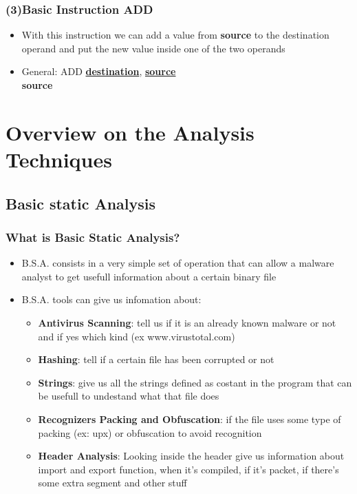 \documentclass[]{beamer}
\begin{document}
		\begin{frame}
			\frametitle{(3)Basic Instruction ADD}
			\begin{itemize}
				\item{With this instruction we can add a value from \textbf{source}  to the destination operand and put the new value inside one of the two operands}
				\item{General: ADD \underline{\textbf{destination}}, \underline{\textbf{source}}\\
					\textbf{source}}
			\end{itemize}
		\end{frame}
\section {Overview on the Analysis Techniques }
	\subsection{Basic static Analysis}
		\begin{frame}
			\frametitle{What is Basic Static Analysis?}
			
			\begin{itemize}
				\item {B.S.A. consists in a very simple set of operation that can allow a malware analyst to get usefull information about a certain binary file}
				\item {B.S.A. tools can give us infomation about:}
				\begin{itemize}
					\item{\textbf{Antivirus Scanning}: tell us if it is an already known malware or not and if yes which kind (ex www.virustotal.com) }
					\item{\textbf{Hashing}: tell if a certain file has been corrupted or not}
					\item{\textbf{Strings}: give us all the strings defined as costant in the program that can be usefull to undestand what that file does}
					\item{\textbf{Recognizers Packing and Obfuscation}: if the file uses some type of packing (ex: upx) or obfuscation to avoid recognition} 
					\item{\textbf{Header Analysis}: Looking inside the header give us information about import and export function, when it's compiled, if it's packet, if there's some extra segment and other stuff }
				\end{itemize}
			\end{itemize}
		\end{frame}
\end{document}
